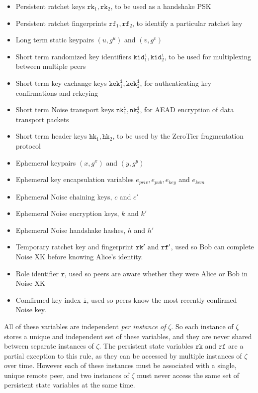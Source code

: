 \documentclass{article}
\begin{document}
\begin{itemize}
	\item Persistent ratchet keys $\texttt{rk}_1, \texttt{rk}_2$, to be used as a handshake PSK
	\item Persistent ratchet fingerprints $\texttt{rf}_1, \texttt{rf}_2$, to identify a particular ratchet key
	\item Long term static keypairs $(u, g^u)$ and $(v, g^v)$
	\item Short term randomized key identifiers $\texttt{kid}^\texttt{i}_1, \texttt{kid}^\texttt{i}_2$, to be used for multiplexing between multiple peers
	\item Short term key exchange keys $\texttt{kek}^\texttt{i}_1, \texttt{kek}^\texttt{i}_2$, for authenticating key confirmations and rekeying
	\item Short term Noise transport keys $\texttt{nk}^\texttt{i}_1, \texttt{nk}^\texttt{i}_2$, for AEAD encryption of data transport packets
	\item Short term header keys $\texttt{hk}_1, \texttt{hk}_2$, to be used by the ZeroTier fragmentation protocol
	\item Ephemeral keypairs $(x, g^x)$ and $(y, g^y)$
	\item Ephemeral key encapsulation variables $e_{priv}, e_{pub}, e_{key}$ and $e_{kem}$
	\item Ephemeral Noise chaining keys, $c$ and $c'$
	\item Ephemeral Noise encryption keys, $k$ and $k'$
	\item Ephemeral Noise handshake hashes, $h$ and $h'$
	\item Temporary ratchet key and fingerprint $\texttt{rk}'\text{ and } \texttt{rf}'$, used so Bob can complete Noise XK before knowing Alice's identity.
	\item Role identifier $\texttt{r}$, used so peers are aware whether they were Alice or Bob in Noise XK
	\item Comfirmed key index $\texttt{i}$, used so peers know the most recently confirmed Noise key.
\end{itemize}

All of these variables are independent \emph{per instance of} $\zeta$. So each instance of $\zeta$ stores a unique and independent set of these variables, and they are never shared between separate instances of $\zeta$. The persistent state variables $\texttt{rk}$ and $\texttt{rf}$ are a partial exception to this rule, as they can be accessed by multiple instances of $\zeta$ over time. However each of these instances must be associated with a single, unique remote peer, and two instances of $\zeta$ must never access the same set of persistent state variables at the same time.
\end{document}
